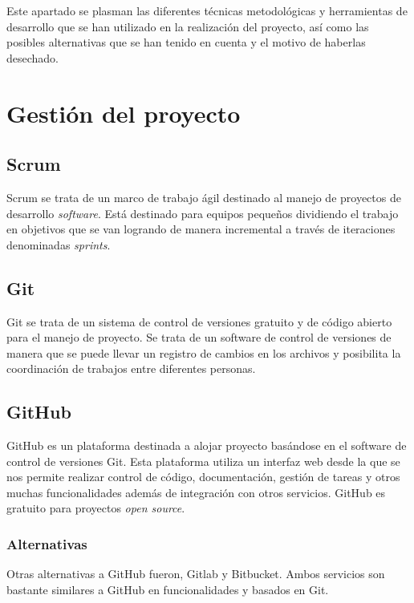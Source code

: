 
Este apartado se plasman las diferentes técnicas metodológicas y herramientas de desarrollo que se han utilizado en la realización del proyecto, así como las posibles alternativas que se han tenido en cuenta y el motivo de haberlas desechado.

\section{Gestión del proyecto}\label{GesProyecto}
\subsection{Scrum}\label{Scrum}
Scrum se trata de un marco de trabajo ágil destinado al manejo de proyectos de desarrollo \emph{software}. Está destinado para equipos pequeños dividiendo el trabajo en objetivos que se van logrando de manera incremental a través de iteraciones denominadas \emph{sprints}. \cite{wiki:scrm}

\subsection{Git}\label{Git}
Git se trata de un sistema de control de versiones gratuito y de código abierto para el manejo de proyecto. Se trata de un software de control de versiones de manera que se puede llevar un registro de cambios en los archivos y posibilita la coordinación de trabajos entre diferentes personas. \cite{git_1,git_2}

\subsection{GitHub}\label{GitHub}
GitHub es un plataforma destinada a alojar proyecto basándose en el software de control de versiones Git. Esta plataforma utiliza un interfaz web desde la que se nos permite realizar control de código, documentación, gestión de tareas y otros muchas funcionalidades además de integración con otros servicios. GitHub es gratuito para proyectos \emph{open source}. \cite{wiki:github_wiki,github}

\subsubsection{Alternativas}\label{AlternativasGitHub}
Otras alternativas a GitHub fueron, Gitlab y Bitbucket. Ambos servicios son bastante similares a GitHub en funcionalidades y basados en Git.


